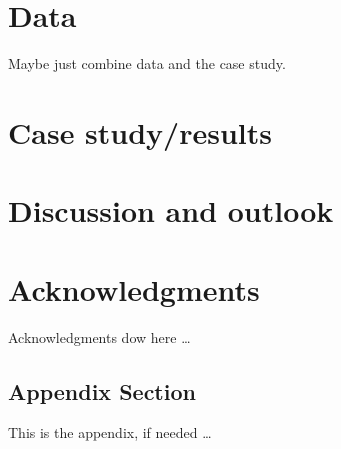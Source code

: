 \documentclass[article,nojss,shortnames]{jss}
\begin{document}
\section{Data}

Maybe just combine data and the case study.

\section{Case study/results}


\section{Discussion and outlook}




\section*{Acknowledgments}

Acknowledgments dow here \dots


\newpage


\newpage

\begin{appendix}

\section{Appendix Section}

This is the appendix, if needed \dots

\end{appendix}
\end{document}
